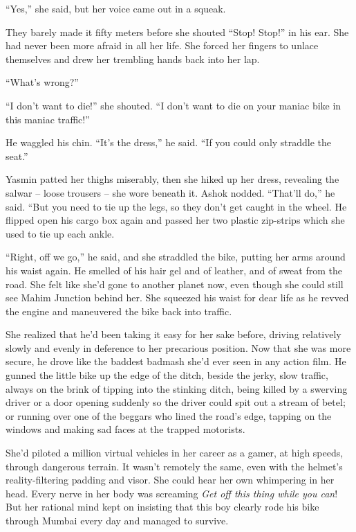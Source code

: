 ``Yes,'' she said, but her voice came out in a squeak.

They barely made it fifty meters before she shouted ``Stop! Stop!''
in his ear. She had never been more afraid in all her life. She
forced her fingers to unlace themselves and drew her trembling
hands back into her lap.

``What's wrong?''

``I don't want to die!'' she shouted. ``I don't want to die on your
maniac bike in this maniac traffic!''

He waggled his chin. ``It's the dress,'' he said. ``If you could only
straddle the seat.''

Yasmin patted her thighs miserably, then she hiked up her dress,
revealing the salwar -- loose trousers -- she wore beneath it.
Ashok nodded. ``That'll do,'' he said. ``But you need to tie up the
legs, so they don't get caught in the wheel. He flipped open his
cargo box again and passed her two plastic zip-strips which she
used to tie up each ankle.

``Right, off we go,'' he said, and she straddled the bike, putting
her arms around his waist again. He smelled of his hair gel and of
leather, and of sweat from the road. She felt like she'd gone to
another planet now, even though she could still see Mahim Junction
behind her. She squeezed his waist for dear life as he revved the
engine and maneuvered the bike back into traffic.

She realized that he'd been taking it easy for her sake before,
driving relatively slowly and evenly in deference to her precarious
position. Now that she was more secure, he drove like the baddest
badmash she'd ever seen in any action film. He gunned the little
bike up the edge of the ditch, beside the jerky, slow traffic,
always on the brink of tipping into the stinking ditch, being
killed by a swerving driver or a door opening suddenly so the
driver could spit out a stream of betel; or running over one of the
beggars who lined the road's edge, tapping on the windows and
making sad faces at the trapped motorists.

She'd piloted a million virtual vehicles in her career as a gamer,
at high speeds, through dangerous terrain. It wasn't remotely the
same, even with the helmet's reality-filtering padding and visor.
She could hear her own whimpering in her head. Every nerve in her
body was screaming \emph{Get off this thing while you can}! But her
rational mind kept on insisting that this boy clearly rode his bike
through Mumbai every day and managed to survive.

